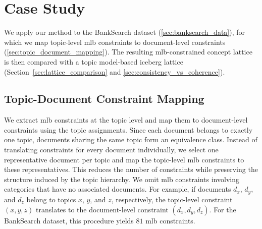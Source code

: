 \section{Case Study}
\label{sec:case_study}

We apply our method to the BankSearch dataset (\autoref{sec:banksearch_data}), for which we map topic-level \ac{mlb} constraints to document-level constraints (\autoref{sec:topic_document_mapping}).
The resulting \ac{mlb}-constrained concept lattice is then compared with a topic model-based iceberg lattice (Section~\ref{sec:lattice_comparison} and \ref{sec:consistency_vs_coherence}).




\subsection{Topic-Document Constraint Mapping}
\label{sec:topic_document_mapping}

We extract \ac{mlb} constraints at the topic level and map them to document-level constraints using the topic assignments.
Since each document belongs to exactly one topic, documents sharing the same topic form an equivalence class. Instead of translating constraints for every document individually, we select one representative document per topic and map the topic-level \ac{mlb} constraints to these representatives. 
This reduces the number of constraints while preserving the structure induced by the topic hierarchy.
 We omit \ac{mlb} constraints involving categories that have no associated documents.
For example, if documents $d_x$, $d_y$, and $d_z$ belong to topics $x$, $y$, and $z$, respectively, the topic-level constraint $(x,y,z)$ translates to the document-level constraint $(d_x, d_y, d_z)$.
For the BankSearch dataset, this procedure yields $81$ \ac{mlb} constraints.

% 





